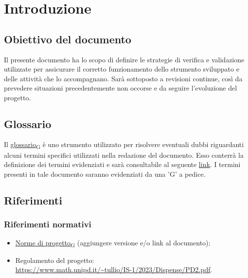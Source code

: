 \section{Introduzione}
\subsection{Obiettivo del documento}
Il presente documento ha lo scopo di definire le strategie di verifica e validazione utilizzate per assicurare il corretto funzionamento dello strumento sviluppato e delle
attività che lo accompagnano.  Sarà sottoposto a revisioni continue, così da prevedere situazioni precedentemente non occorse e da seguire l'evoluzione del progetto.
\subsection{Glossario}
Il \href{https://7last.github.io/docs/rtb/documentazione-interna/glossario#glossario}{glossario\textsubscript{G}} è uno strumento utilizzato per risolvere eventuali dubbi riguardanti 
alcuni termini specifici utilizzati nella redazione del documento.
Esso conterrà la definizione dei termini evidenziati e sarà consultabile al seguente \href{https://7last.github.io/docs/rtb/documentazione-interna/glossario}{link}. I termini presenti in tale documento saranno evidenziati da una 'G' a pedice.
\subsection{Riferimenti}
\subsubsection{Riferimenti normativi}
\begin{itemize}
    \item \href{https://7last.github.io/docs/rtb/documentazione-interna/glossario#norme-di-progetto}{Norme di progetto\textsubscript{G}} (aggiungere versione e/o link al documento);
    \item Regolamento del progetto:\\
		  \url{https://www.math.unipd.it/~tullio/IS-1/2023/Dispense/PD2.pdf}.
\end{itemize}
